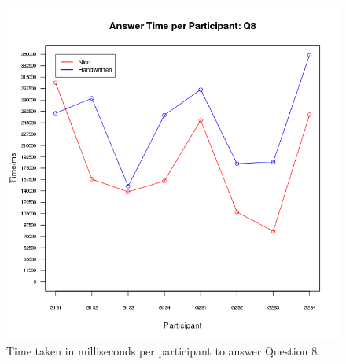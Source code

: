 \documentclass[12pt,twoside,notitlepage,xetex]{report}
\begin{document}
{\begin{center}
\begin{figure}[H]
\begin{center}
\includegraphics[height=\textheight/2-2cm]{figs/graphs/q8.png}
\end{center}
\caption{Time taken in milliseconds per participant to answer Question 8.}
\end{figure}
\end{center}

}
\end{document}
